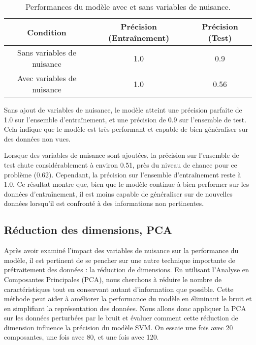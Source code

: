 \documentclass{article}
\begin{document}
\begin{table}[ht]
\centering
\begin{tabular}{|c|c|c|}
\hline
\textbf{Condition}                          & \textbf{Précision (Entraînement)} & \textbf{Précision (Test)} \\ \hline
Sans variables de nuisance                  & 1.0                              & 0.9                        \\ \hline
Avec variables de nuisance                  & 1.0                              & 0.56                       \\ \hline
\end{tabular}
\caption{Performances du modèle avec et sans variables de nuisance.}
\label{tab:nuisance_variables_performance}
\end{table}


Sans ajout de variables de nuisance, le modèle atteint une précision parfaite de 1.0 sur l'ensemble d'entraînement, et une précision de 0.9 sur l'ensemble de test. Cela indique que le modèle est très performant et capable de bien généraliser sur des données non vues.

Lorsque des variables de nuisance sont ajoutées, la précision sur l'ensemble de test chute considérablement à environ 0.51, près du niveau de chance pour ce problème (0.62). Cependant, la précision sur l'ensemble d'entraînement reste à 1.0. Ce résultat montre que, bien que le modèle continue à bien performer sur les données d'entraînement, il est moins capable de généraliser sur de nouvelles données lorsqu'il est confronté à des informations non pertinentes.

\subsection{Réduction des dimensions, PCA}
Après avoir examiné l'impact des variables de nuisance sur la performance du modèle, il est pertinent de se pencher sur une autre technique importante de prétraitement des données : la réduction de dimensions. En utilisant l'Analyse en Composantes Principales (PCA), nous cherchons à réduire le nombre de caractéristiques tout en conservant autant d'information que possible. Cette méthode peut aider à améliorer la performance du modèle en éliminant le bruit et en simplifiant la représentation des données.
Nous allons donc appliquer la PCA sur les données perturbées par le bruit et évaluer comment cette réduction de dimension influence la précision du modèle SVM. On essaie une fois avec 20 composantes, une fois avec 80, et une fois avec 120.
\end{document}
